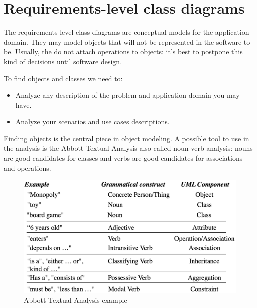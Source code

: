 \documentclass[12pt, a4paper]{report}
\theoremstyle{remark}
\begin{document}
\section{Requirements-level class diagrams}
    The requirements-level class diagrams are conceptual models for the application domain. They may model objects that will not be represented in the software-to-be. Usually, the do not attach operations to objects: it's best to postpone this kind of decisions until software design. 
    \par
    To find objects and classes we need to:
    \begin{itemize}
        \item Analyze any description of the problem and application domain you may have.
        \item Analyze your scenarios and use cases descriptions.
    \end{itemize}
    Finding objects is the central piece in object modeling. A possible tool to use in the analysis is the Abbott Textual Analysis also called noun-verb analysis: nouns are good candidates for classes and verbs are good candidates for associations and operations. 
    \begin{figure}
        \centering
        \includegraphics[width=0.5\linewidth]{images/Abbott.png}
        \caption{Abbott Textual Analysis example}
    \end{figure}
\end{document}
